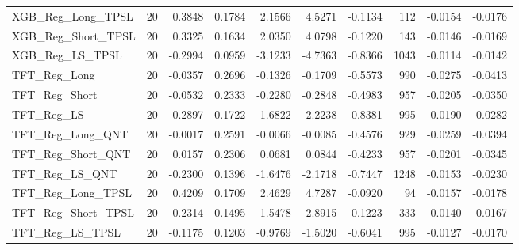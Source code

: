 \begin{tabular}{llrrrrrrrr}
\cline{1-10}
XGB\_Reg\_Long\_TPSL & 20 & 0.3848 & 0.1784 & 2.1566 & 4.5271 & -0.1134 & 112 & -0.0154 & -0.0176 \\
\cline{1-10}
XGB\_Reg\_Short\_TPSL & 20 & 0.3325 & 0.1634 & 2.0350 & 4.0798 & -0.1220 & 143 & -0.0146 & -0.0169 \\
\cline{1-10}
XGB\_Reg\_LS\_TPSL & 20 & -0.2994 & 0.0959 & -3.1233 & -4.7363 & -0.8366 & 1043 & -0.0114 & -0.0142 \\
\cline{1-10}
TFT\_Reg\_Long & 20 & -0.0357 & 0.2696 & -0.1326 & -0.1709 & -0.5573 & 990 & -0.0275 & -0.0413 \\
\cline{1-10}
TFT\_Reg\_Short & 20 & -0.0532 & 0.2333 & -0.2280 & -0.2848 & -0.4983 & 957 & -0.0205 & -0.0350 \\
\cline{1-10}
TFT\_Reg\_LS & 20 & -0.2897 & 0.1722 & -1.6822 & -2.2238 & -0.8381 & 995 & -0.0190 & -0.0282 \\
\cline{1-10}
TFT\_Reg\_Long\_QNT & 20 & -0.0017 & 0.2591 & -0.0066 & -0.0085 & -0.4576 & 929 & -0.0259 & -0.0394 \\
\cline{1-10}
TFT\_Reg\_Short\_QNT & 20 & 0.0157 & 0.2306 & 0.0681 & 0.0844 & -0.4233 & 957 & -0.0201 & -0.0345 \\
\cline{1-10}
TFT\_Reg\_LS\_QNT & 20 & -0.2300 & 0.1396 & -1.6476 & -2.1718 & -0.7447 & 1248 & -0.0153 & -0.0230 \\
\cline{1-10}
TFT\_Reg\_Long\_TPSL & 20 & 0.4209 & 0.1709 & 2.4629 & 4.7287 & -0.0920 & 94 & -0.0157 & -0.0178 \\
\cline{1-10}
TFT\_Reg\_Short\_TPSL & 20 & 0.2314 & 0.1495 & 1.5478 & 2.8915 & -0.1223 & 333 & -0.0140 & -0.0167 \\
\cline{1-10}
TFT\_Reg\_LS\_TPSL & 20 & -0.1175 & 0.1203 & -0.9769 & -1.5020 & -0.6041 & 995 & -0.0127 & -0.0170 \\
\cline{1-10}
\bottomrule
\end{tabular}
